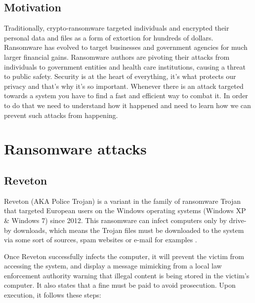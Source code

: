 \documentclass[10pt,a4paper]{article}
\begin{document}
\subsection{Motivation}
Traditionally, crypto-ransomware targeted individuals and encrypted their personal data and files as a form of extortion for hundreds of dollars. Ransomware has evolved to target businesses and government agencies for much larger financial gains. Ransomware authors are pivoting their attacks from individuals to government entities and health care institutions, causing a threat to public safety. Security is at the heart of everything, it's what protects our privacy and that's why it's so important. Whenever there is an attack targeted towards a system you have to find a fast and efficient way to combat it. In order to do that we need to understand how it happened and need to learn how we can prevent such attacks from happening.

\section{Ransomware attacks}

\subsection{Reveton}
Reveton (AKA Police Trojan) is a variant in the family of ransomware Trojan that targeted European users on the Windows operating systems (Windows XP \& Windows 7) since 2012. This ransomware can infect computers only by drive-by downloads, which means the Trojan files must be downloaded to the system via some sort of sources, spam websites or e-mail for examples .

Once Reveton successfully infects the computer, it will prevent the victim from accessing the system, and display a message mimicking from a local law enforcement authority warning that illegal content is being stored in the victim’s computer. It also states that a fine must be paid to avoid prosecution.
Upon execution, it follows these steps\cite{revetonanalysis}:
\end{document}
